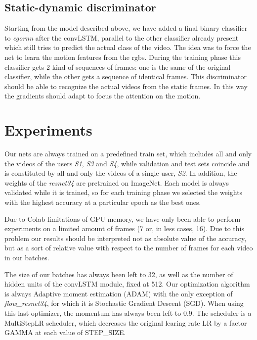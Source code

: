 \documentclass[10pt,twocolumn,hidelinks,letterpaper]{article}
\begin{document}
\subsection{Static-dynamic discriminator}

Starting from the model described above, we have added a final binary classifier to \textit{egornn} after the convLSTM, parallel to the other classifier already present which still tries to predict the actual class of the video. The idea was to force the net to learn the motion features from the rgbs. During the training phase this classifier gets 2 kind of sequences of frames: one is the same of the original classifier, while the other gets a sequence of identical frames. This discriminator should be able to recognize the actual videos from the static frames. In this way the gradients should adapt to focus the attention on the motion.

\section{Experiments}

Our nets are always trained on a predefined train set, which includes all and only the videos of the users \textit{S1}, \textit{S3} and \textit{S4}, while validation and test sets coincide and is constituted by all and only the videos of a single user, \textit{S2}. In addition, the weights of the \textit{resnet34} are pretrained on ImageNet. Each model is always validated while it is trained, so for each training phase we selected the weights with the highest accuracy at a particular epoch as the best ones.

Due to Colab limitations of GPU memory, we have only been able to perform experiments on a limited amount of frames (7 or, in less cases, 16). Due to this problem our results should be interpreted not as absolute value of the accuracy, but as a sort of relative value with respect to the number of frames for each video in our batches.

The size of our batches has always been left to 32, as well as the number of hidden units of the convLSTM module, fixed at 512. Our optimization algorithm is always Adaptive moment estimation (ADAM) with the only exception of \textit{flow\_resnet34}, for which it is Stochastic Gradient Descent (SGD). When using this last optimizer, the momentum has always been left to 0.9. The scheduler is a MultiStepLR scheduler, which decreases the original learing rate LR by a factor GAMMA at each value of STEP\_SIZE.
\end{document}
